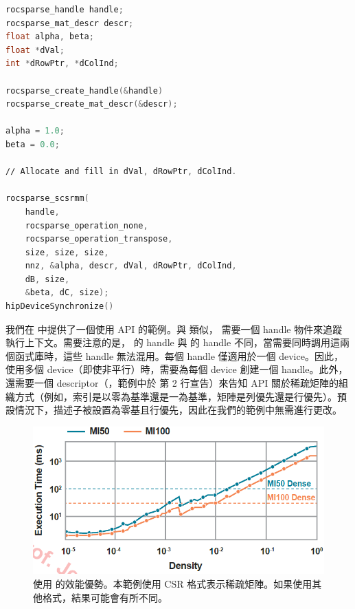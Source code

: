 \begin{lstlisting}[language=C, caption={使用 \term{rocSPARSE} 進行矩陣乘法的範例。一個矩陣以 CSR 格式表示，另一個矩陣以密集矩陣表示。為簡化起見，錯誤處理和記憶體釋放的程式碼已被省略。}, captionpos=t, label={lst:CSR}]
rocsparse_handle handle;
rocsparse_mat_descr descr;
float alpha, beta;
float *dVal;
int *dRowPtr, *dColInd;

rocsparse_create_handle(&handle)
rocsparse_create_mat_descr(&descr);

alpha = 1.0;
beta = 0.0;

∕∕ Allocate and fill in dVal, dRowPtr, dColInd.

rocsparse_scsrmm(
    handle,
    rocsparse_operation_none,
    rocsparse_operation_transpose,
    size, size, size,
    nnz, &alpha, descr, dVal, dRowPtr, dColInd,
    dB, size,
    &beta, dC, size);
hipDeviceSynchronize()
\end{lstlisting}

我們在  中提供了一個使用  API 的範例。與  類似， 需要一個 handle 物件來追蹤執行上下文。需要注意的是， 的 handle 與  的 handle 不同，當需要同時調用這兩個函式庫時，這些 handle 無法混用。每個 handle 僅適用於一個 device。因此，使用多個 device（即使非平行）時，需要為每個 device 創建一個 handle。此外，還需要一個 descriptor（，範例中於  第 2 行宣告）來告知 API 關於稀疏矩陣的組織方式（例如，索引是以零為基準還是一為基準，矩陣是列優先還是行優先）。預設情況下，描述子被設置為零基且行優先，因此在我們的範例中無需進行更改。

\begin{figure}[h]
    \centering
    \includegraphics[width=0.9\linewidth]{FileAusiliari/Screenshots/Figure9-2.png}
    \caption{使用  的效能優勢。本範例使用 CSR 格式表示稀疏矩陣。如果使用其他格式，結果可能會有所不同。}
    \label{fig:CSR}
\end{figure}


